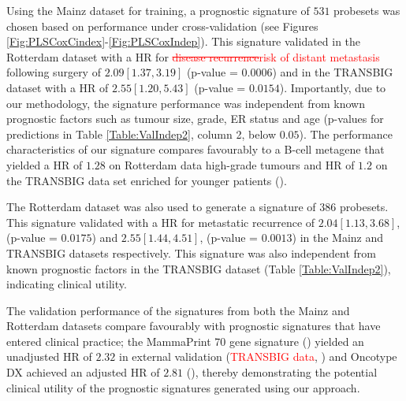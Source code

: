 \documentclass[letterpaper,12pt]{article}
\begin{document}
Using the Mainz dataset for training, a prognostic signature of $531$ probesets was chosen based on performance under cross-validation (see Figures \ref{Fig:PLSCoxCindex}-\ref{Fig:PLSCoxIndep}). This signature validated in the Rotterdam dataset with a HR for \textcolor{red}{\sout{disease recurrence}risk of distant metastasis} following surgery of $2.09 [1.37, 3.19]$ (p-value = $0.0006$) and in the TRANSBIG dataset with a HR of $2.55 [1.20, 5.43]$ (p-value = $0.0154$). Importantly, due to our methodology, the signature performance was independent from known prognostic factors such as tumour size, grade, ER status and age (p-values for predictions in Table \ref{Table:ValIndep2}, column 2, below $0.05$). The performance characteristics of our signature compares favourably to a B-cell metagene that yielded a HR of $1.28$ on Rotterdam data high-grade tumours and HR of $1.2$ on the TRANSBIG data set enriched for younger patients (\citet{Schmidt:08}). 

The Rotterdam dataset was also used to generate a signature of $386$ probesets. This signature validated with a HR for metastatic recurrence of $2.04 [1.13, 3.68]$, (p-value = $0.0175$) and $2.55 [1.44, 4.51]$, (p-value = $0.0013$) in the Mainz and TRANSBIG datasets respectively. This signature was also independent from known prognostic factors in the TRANSBIG dataset (Table \ref{Table:ValIndep2}), indicating clinical utility.

The validation performance of the signatures from both the Mainz and Rotterdam datasets compare favourably with prognostic signatures that have entered clinical practice; the MammaPrint 70 gene signature (\citet{Veer:02}) yielded an unadjusted HR of $2.32$ in external validation (\textcolor{red}{TRANSBIG data}, \citet{Buyse:06}) and Oncotype DX achieved an adjusted HR of $2.81$ (\citet{Paik:04}), thereby demonstrating the potential clinical utility of the prognostic signatures generated using our approach.
\end{document}
